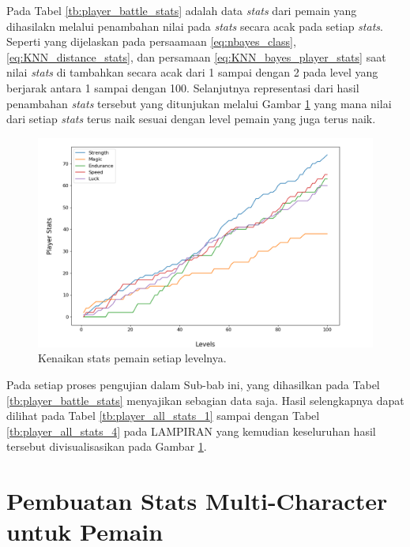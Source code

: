 Pada Tabel \ref{tb:player_battle_stats} adalah data \textit{stats} dari pemain yang dihasilakn melalui penambahan nilai pada \textit{stats} secara acak pada setiap \textit{stats}. Seperti yang dijelaskan pada persaamaan \ref{eq:nbayes_class}, \ref{eq:KNN_distance_stats}, dan persamaan \ref{eq:KNN_bayes_player_stats} saat nilai \textit{stats} di tambahkan secara acak dari 1 sampai dengan 2 pada level yang berjarak antara 1 sampai dengan 100. Selanjutnya representasi dari hasil penambahan \textit{stats} tersebut yang ditunjukan melalui Gambar \ref{fig:stats_player} yang mana nilai dari setiap \textit{stats} terus naik sesuai dengan level pemain yang juga terus naik. 
\vspace{1ex}

\begin{figure} [!h] \centering
	\includegraphics[scale=0.50]{img/PlayerStatsDistrib.png}
	\caption{Kenaikan stats pemain setiap levelnya.}
	\label{fig:stats_player}
\end{figure}

Pada setiap proses pengujian dalam Sub-bab ini, yang dihasilkan pada Tabel \ref{tb:player_battle_stats} menyajikan sebagian data saja. Hasil selengkapnya dapat dilihat pada Tabel \ref{tb:player_all_stats_1} sampai dengan Tabel \ref{tb:player_all_stats_4} pada LAMPIRAN yang kemudian keseluruhan hasil tersebut divisualisasikan pada Gambar \ref{fig:stats_player}.
\vspace{1ex}

\section{Pembuatan Stats Multi-Character untuk Pemain}
\label{sec:sec4_eval_multi-character_player}
\vspace{1ex}


